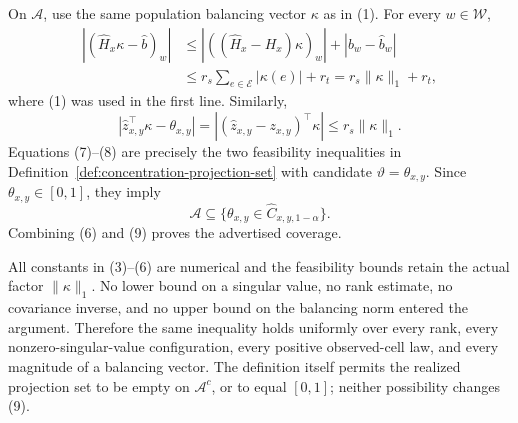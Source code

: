 On \(\mathcal A\), use the same population balancing vector \(\kappa\) as in (1). For every \(w\in\mathcal W\),
\[
\begin{aligned}
| (\widehat H_x\kappa-\widehat b)_w |
&\le |((\widehat H_x-H_x)\kappa)_w|+|b_w-\widehat b_w|\\
&\le r_s\sum_{e\in\mathcal E}|\kappa(e)|+r_t
=r_s\lVert\kappa\rVert_1+r_t,
\end{aligned}
\tag{7}
\]
where (1) was used in the first line. Similarly,
\[
|\widehat z_{x,y}^{\top}\kappa-\theta_{x,y}|
=| (\widehat z_{x,y}-z_{x,y})^{\top}\kappa |
\le r_s\lVert\kappa\rVert_1.
\tag{8}
\]
Equations (7)--(8) are precisely the two feasibility inequalities in Definition~\ref{def:concentration-projection-set} with candidate \(\vartheta=\theta_{x,y}\). Since \(\theta_{x,y}\in[0,1]\), they imply
\[
\mathcal A\subseteq
\{\theta_{x,y}\in\widehat C_{x,y,1-\alpha}\}.
\tag{9}
\]
Combining (6) and (9) proves the advertised coverage.

All constants in (3)--(6) are numerical and the feasibility bounds retain the actual factor \(\lVert\kappa\rVert_1\). No lower bound on a singular value, no rank estimate, no covariance inverse, and no upper bound on the balancing norm entered the argument. Therefore the same inequality holds uniformly over every rank, every nonzero-singular-value configuration, every positive observed-cell law, and every magnitude of a balancing vector. The definition itself permits the realized projection set to be empty on \(\mathcal A^c\), or to equal \([0,1]\); neither possibility changes (9).